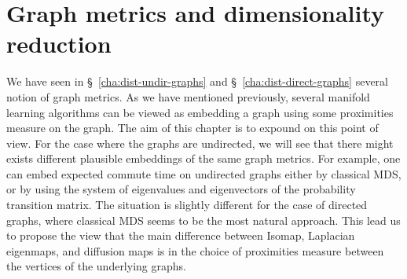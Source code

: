 \chapter{Graph metrics and dimensionality reduction}
\label{cha:graph-metr-dimens}
We have seen in \S~\ref{cha:dist-undir-graphs} and
\S~\ref{cha:dist-direct-graphs} several notion of graph metrics. As we
have mentioned previously, several manifold learning algorithms can be
viewed as embedding a graph using some proximities measure on the
graph. The aim of this chapter is to expound on this point of
view. For the case where the graphs are undirected, we will see that
there might exists different plausible embeddings of the same graph
metrics. For example, one can embed expected commute time on
undirected graphs either by classical MDS, or by using the system of
eigenvalues and eigenvectors of the probability transition matrix.
The situation is slightly different for the case of directed graphs,
where classical MDS seems to be the most natural approach.  This lead
us to propose the view that the main difference between Isomap,
Laplacian eigenmaps, and diffusion maps is in the choice of
proximities measure between the vertices of the underlying graphs.
